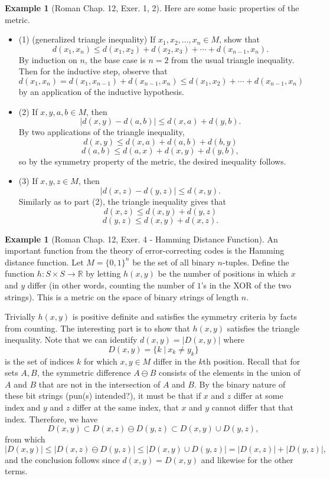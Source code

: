 \documentclass[psamsfonts]{amsart}
\theoremstyle{definition}
\newtheorem{exmp}[thm]{Example}
\theoremstyle{remark}
\numberwithin{equation}{section}
\begin{document}
\begin{exmp}[Roman Chap. 12, Exer. 1, 2]
Here are some basic properties of the metric.
\begin{itemize}
    \item (1) (generalized triangle inequality) If $x_1, x_2, \dots , x_n \in M$, show that 
    $$d(x_1, x_n) \leq d(x_1, x_2) + d(x_2, x_3) + \cdots + d(x_{n-1}, x_n ).$$
    By induction on $n$, the base case is $n = 2$ from the usual triangle inequality. Then for the inductive step, observe that 
    $$d(x_1, x_n) = d(x_1, x_{n-1}) + d(x_{n-1}, x_n) \leq d(x_1, x_2) + \cdots + d(x_{n-1}, x_n) $$
    by an application of the inductive hypothesis. 
    \item (2) If $x,y,a,b \in M$, then 
    $$|d(x,y) - d(a,b)| \leq d(x,a) + d(y,b). $$
    By two applications of the triangle inequality, 
    $$d(x,y) \leq d(x,a) + d(a, b) + d(b, y) $$
    $$d(a,b) \leq d(a, x) + d(x,y) + d(y,b), $$
    so by the symmetry property of the metric, the desired inequality follows. 
    \item (3) If $x,y,z \in M$, then 
    $$|d(x,z) - d(y,z)| \leq d(x,y).$$
    Similarly as to part (2), the triangle inequality gives that 
    $$d(x,z) \leq d(x,y) + d(y,z) $$
    $$d(y,z) \leq d(x,y) + d(x,z). $$
\end{itemize}
\end{exmp}

\begin{exmp}[Roman Chap. 12, Exer. 4 - Hamming Distance Function]
An important function from the theory of error-correcting codes is the Hamming distance function. Let $M = \{ 0, 1 \} ^n$ be the set of all binary $n$-tuples. Define the function $h: S \times S \rightarrow \mathbb{R}$ by letting $h(x,y)$ be the number of positions in which $x$ and $y$ differ (in other words, counting the number of $1$'s in the XOR of the two strings). This is a metric on the space of binary strings of length $n$. 

Trivially $h(x,y)$ is positive definite and satisfies the symmetry criteria by facts from counting. The interesting part is to show that $h(x,y)$ satisfies the triangle inequality. Note that we can identify $d(x,y) = |D(x,y) |$ where
$$D(x,y) = \{ k \; | \: x_k \neq y_k \} $$
is the set of indices $k$ for which $x,y \in M$ differ in the $k$th position. Recall that for sets $A, B$, the symmetric difference $A\ominus B$ consists of the elements in the union of $A$ and $B$ that are not in the intersection of $A$ and $B$. By the binary nature of these bit strings (pun(s) intended?), it must be that if $x$ and $z$ differ at some index and $y$ and $z$ differ at the same index, that $x$ and $y$ cannot differ that that index. Therefore, we have
$$D(x,y) \subset D(x,z) \ominus D(y,z) \subset D(x,y) \cup D(y,z), $$
from which 
$$|D(x,y)| \leq |D(x,z) \ominus D(y,z) | \leq |D(x,y) \cup D(y,z) | = |D(x,z)| + |D(y,z)|,$$
and the conclusion follows since $d(x,y) = D(x,y)$ and likewise for the other terms.
\end{exmp}
\end{document}
